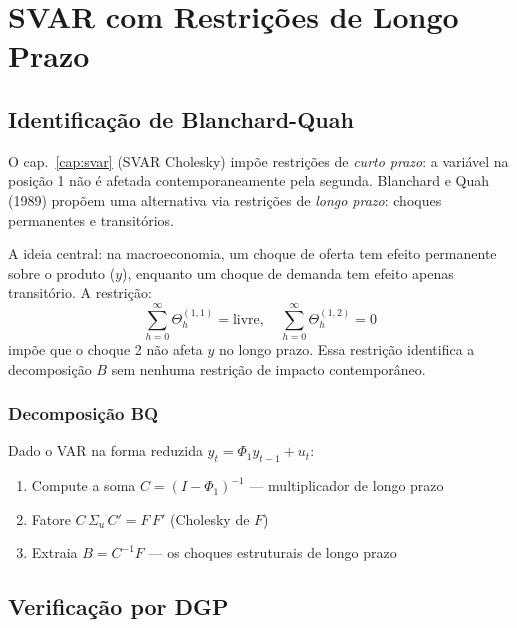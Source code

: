 \chapter{SVAR com Restrições de Longo Prazo}
\label{cap:svar2}

\section{Identificação de Blanchard-Quah}

O cap.~\ref{cap:svar} (SVAR Cholesky) impõe restrições de \emph{curto prazo}:
a variável na posição 1 não é afetada contemporaneamente pela segunda.
Blanchard e Quah (1989) propõem uma alternativa via restrições de
\emph{longo prazo}: choques permanentes e transitórios.

A ideia central: na macroeconomia, um choque de oferta tem efeito permanente
sobre o produto ($y$), enquanto um choque de demanda tem efeito apenas
transitório. A restrição:
\[
  \sum_{h=0}^\infty \Theta_h^{(1,1)} = \text{livre}, \quad
  \sum_{h=0}^\infty \Theta_h^{(1,2)} = 0
\]
impõe que o choque 2 não afeta $y$ no longo prazo. Essa restrição identifica
a decomposição $B$ sem nenhuma restrição de impacto contemporâneo.

\subsection*{Decomposição BQ}

Dado o VAR na forma reduzida $y_t = \Phi_1 y_{t-1} + u_t$:
\begin{enumerate}
  \item Compute a soma $C = (I - \Phi_1)^{-1}$ — multiplicador de longo prazo
  \item Fatore $C\,\Sigma_u\,C' = F\,F'$ (Cholesky de $F$)
  \item Extraia $B = C^{-1} F$ — os choques estruturais de longo prazo
\end{enumerate}

\section{Verificação por DGP}

